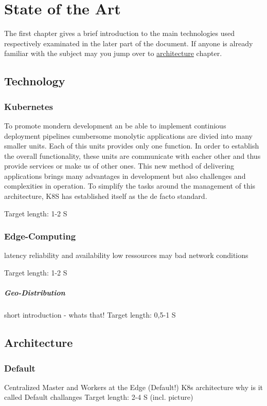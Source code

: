\documentclass[MSC,Master,english]{twbook}%
\begin{document}
\chapter{State of the Art}
\label{chap:current}
The first chapter gives a brief introduction to the main technologies used respectively examinated in the later part of the document. If anyone is already familiar with the subject may you jump over to \hyperref[sec:architecture]{architecture} chapter.
\section{Technology}
\label{sec:technology}
\subsection{Kubernetes}
To promote mondern development an be able to implement continious deployment pipelines cumbersome monolytic applications are divied into many smaller units. Each of this units provides only one function. In order to establish the overall functionality, these units are communicate with eacher other and thus provide services or make us of other ones. This new method of delivering applications brings many advantages in development but also challenges and complexities in operation. To simplify the tasks around the management of this architecture, \ac{K8S} has established itself as the de facto standard\cite{k8ssurv}.

Target length: 1-2 S
\subsection{Edge-Computing}
latency
reliability and availability
low ressources
may bad network conditions

Target length: 1-2 S
\paragraph{Geo-Distribution}
short introduction - whats that!
Target length: 0,5-1 S




\section{Architecture}
\label{sec:architecture}
\subsection{Default}
Centralized Master and Workers at the Edge (Default!) K8s architecture
why is it called Default
challanges
Target length: 2-4 S (incl. picture)
\end{document}
